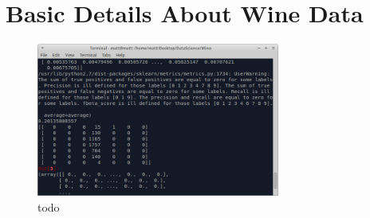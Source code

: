 \documentclass[11pt]{article}
\begin{document}
\section*{Basic Details About Wine Data}

\begin{figure}[h]
  \centering
  \includegraphics[width=8cm]{firstConfusion.png}
  \caption{todo}
  \label{fig:todo}
\end{figure}
\end{document}
